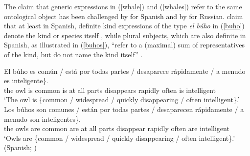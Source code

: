 \documentclass[output=paper,colorlinks,citecolor=brown]{langscibook}
\begin{document}



The claim that generic expressions in (\ref{whale}) and (\ref{whales}) refer to the same ontological object has been challenged by \citet{borikespinal15} for Spanish and by \citet{seres20} for Russian. \citet{borikespinal15} claim that at least in Spanish, definite kind expressions of the type \textit{el b\'{u}ho} in (\ref{buho}) denote the kind or species itself \citep[cf.][]{jespersen27}, while plural subjects, which are also definite in Spanish, as illustrated in (\ref{buhos}), ``refer to a (maximal) sum of representatives of the kind, but do not name the kind itself'' \citep[see][170]{borikespinal15}. 

\ea
\ea \gll El b\'{u}ho \minsp{\{} es  com\'{u}n / est\'{a}  por  todas  partes /  desaparece r\'{a}pidamente /  {a menudo}  es  inteligente\}. \label{buho}\\
the  owl {} is common {}  is at all parts {} disappears rapidly {} often is intelligent \\
\glt `The owl is \{common / widespread / quickly disappearing / often intelligent\}.'
\ex \gll Los  búhos  \minsp{\{} son  comunes / est\'{a}n  por  todas  partes / desaparecen  r\'{a}pidamente /  {a menudo}  son  inteligentes\}. \label{buhos}\\
the owls {} are common {}  are at all parts {}  disappear rapidly {} often are intelligent \\
\glt `Owls are \{common / widespread / quickly disappearing / often intelligent\}.'\\\hfill (Spanish; \cite[][171]{borikespinal15} )
\z
\z
\end{document}
